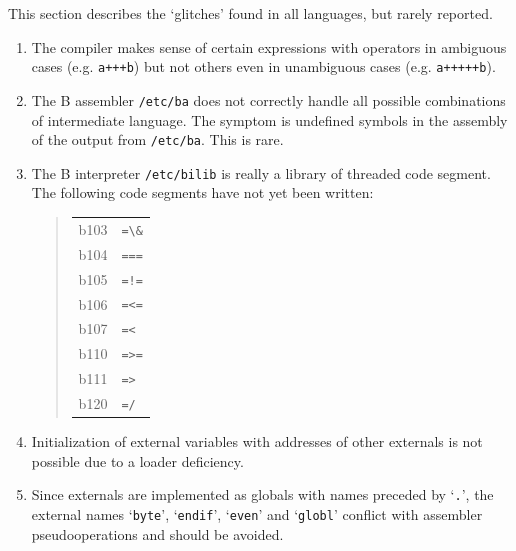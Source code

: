 \documentclass[12pt]{report}
\begin{document}

This section describes the `glitches' found in all languages, but
rarely reported.
\begin{enumerate}
\item The compiler makes sense of certain expressions with operators
  in ambiguous cases (e.g. \verb|a+++b|) but not others even in unambiguous
  cases (e.g. \verb|a+++++b|).
\item The B assembler \verb|/etc/ba| does not correctly handle all possible
  combinations of intermediate language. The symptom is undefined
  symbols in the assembly of the output from \verb|/etc/ba|. This is rare.
\item The B interpreter \verb|/etc/bilib| is really a library of threaded
  code segment. The following code segments have not yet been written:
  \begin{quote}
    \begin{tabular}{ll}
      b103 & \verb|=\&| \\
      b104 & \verb|===| \\
      b105 & \verb|=!=| \\
      b106 & \verb|=<=| \\
      b107 & \verb|=<| \\
      b110 & \verb|=>=| \\
      b111 & \verb|=>| \\
      b120 & \verb|=/| \\
    \end{tabular}
  \end{quote}

\item Initialization of external variables with addresses of other
  externals is not possible due to a loader deficiency.
\item Since externals are implemented as globals with names preceded
  by `\verb|.|', the external names `\verb|byte|', `\verb|endif|',
  `\verb|even|' and `\verb|globl|' conflict with assembler
  pseudooperations and should be avoided.
\end{enumerate}

\end{document}
